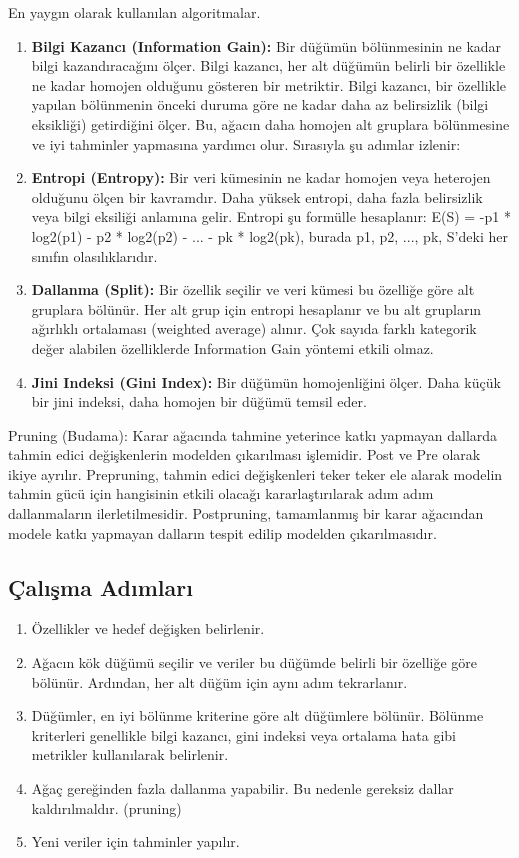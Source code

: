 En yaygın olarak kullanılan algoritmalar.
\begin{enumerate}
    \item \textbf{Bilgi Kazancı (Information Gain):} Bir düğümün bölünmesinin ne kadar bilgi kazandıracağını ölçer. Bilgi kazancı, her alt düğümün belirli bir özellikle ne kadar homojen olduğunu gösteren bir metriktir. Bilgi kazancı, bir özellikle yapılan bölünmenin önceki duruma göre ne kadar daha az belirsizlik (bilgi eksikliği) getirdiğini ölçer. Bu, ağacın daha homojen alt gruplara bölünmesine ve iyi tahminler yapmasına yardımcı olur. Sırasıyla şu adımlar izlenir:
    \item \textbf{Entropi (Entropy):} Bir veri kümesinin ne kadar homojen veya heterojen olduğunu ölçen bir kavramdır. Daha yüksek entropi, daha fazla belirsizlik veya bilgi eksiliği anlamına gelir. Entropi şu formülle hesaplanır: E(S) = -p1 * log2(p1) - p2 * log2(p2) - ... - pk * log2(pk), burada p1, p2, ..., pk, S'deki her sınıfın olasılıklarıdır.
    \item \textbf{Dallanma (Split):} Bir özellik seçilir ve veri kümesi bu özelliğe göre alt gruplara bölünür. Her alt grup için entropi hesaplanır ve bu alt grupların ağırlıklı ortalaması (weighted average) alınır. Çok sayıda farklı kategorik değer alabilen özelliklerde Information Gain yöntemi etkili olmaz.
    \item \textbf{Jini Indeksi (Gini Index):} Bir düğümün homojenliğini ölçer. Daha küçük bir jini indeksi, daha homojen bir düğümü temsil eder.
\end{enumerate}

Pruning (Budama): Karar ağacında tahmine yeterince katkı yapmayan dallarda tahmin edici değişkenlerin modelden çıkarılması işlemidir. Post ve Pre olarak ikiye ayrılır. Prepruning, tahmin edici değişkenleri teker teker ele alarak modelin tahmin gücü için hangisinin etkili olacağı kararlaştırılarak adım adım dallanmaların ilerletilmesidir. Postpruning, tamamlanmış bir karar ağacından modele katkı yapmayan dalların tespit edilip modelden çıkarılmasıdır.

\subsection{Çalışma Adımları}
\begin{enumerate}
    \item Özellikler ve hedef değişken belirlenir.
    \item Ağacın kök düğümü seçilir ve veriler bu düğümde belirli bir özelliğe göre bölünür. Ardından, her alt düğüm için aynı adım tekrarlanır.
    \item Düğümler, en iyi bölünme kriterine göre alt düğümlere bölünür. Bölünme kriterleri genellikle bilgi kazancı, gini indeksi veya ortalama hata gibi metrikler kullanılarak belirlenir.
    \item Ağaç gereğinden fazla dallanma yapabilir. Bu nedenle gereksiz dallar kaldırılmaldır. (pruning)
    \item Yeni veriler için tahminler yapılır.
\end{enumerate}

